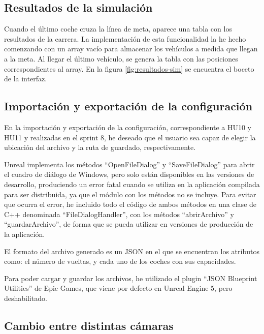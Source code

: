 \subsection{Resultados de la simulación}

Cuando el último coche cruza la línea de meta, aparece una tabla con los resultados de la carrera. La implementación de esta funcionalidad la he hecho comenzando con un array vacío para almacenar los vehículos a medida que llegan a la meta. Al llegar el último vehículo, se genera la tabla con las posiciones correspondientes al array. En la figura \ref{fig:resultados-sim} se encuentra el boceto de la interfaz.


\subsection{Importación y exportación de la configuración}

En la importación y exportación de la configuración, correspondiente a HU10 y HU11 y realizadas en el sprint 8, he deseado que el usuario sea capaz de elegir la ubicación del archivo y la ruta de guardado, respectivamente. 

\bigskip

Unreal implementa los métodos ``OpenFileDialog'' y ``SaveFileDialog'' para abrir el cuadro de diálogo de Windows, pero solo están disponibles en las versiones de desarrollo, produciendo un error fatal cuando se utiliza en la aplicación compilada para ser distribuida, ya que el módulo con los métodos no se incluye. Para evitar que ocurra el error, he incluido todo el código de ambos métodos en una clase de C++ denominada ``FileDialogHandler'', con los métodos ``abrirArchivo'' y ``guardarArchivo'', de forma que se pueda utilizar en versiones de producción de la aplicación.

\bigskip

El formato del archivo generado es un JSON en el que se encuentran los atributos como: el número de vueltas, y cada uno de los coches con sus capacidades.

\bigskip

Para poder cargar y guardar los archivos, he utilizado el plugin ``JSON Blueprint Utilities'' de Epic Games, que viene por defecto en Unreal Engine 5, pero deshabilitado.

\subsection{Cambio entre distintas cámaras}

